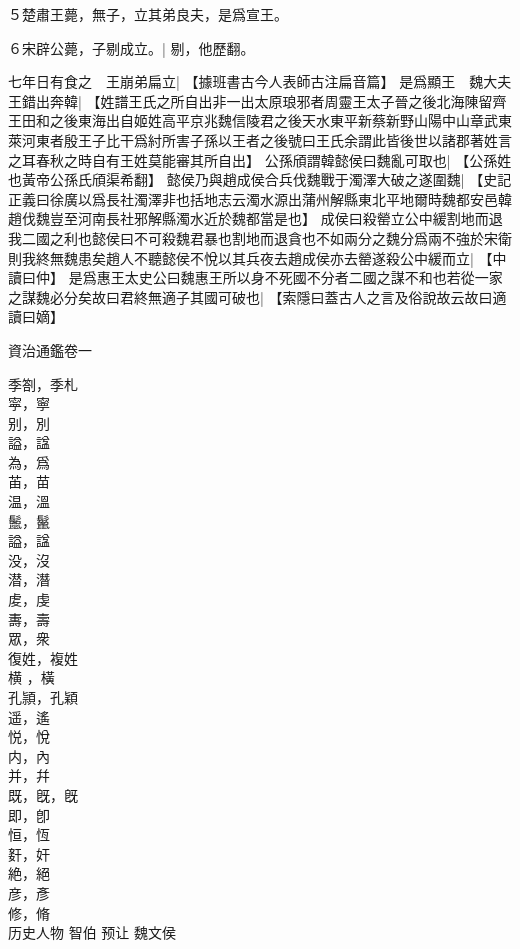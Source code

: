 ５楚肅王薨，無子，立其弟良夫，是爲宣王。

６宋辟公薨，子剔成立。|{
	剔，他歷翻。
	}


七年日有食之　王崩弟扁立|{
	【據班書古今人表師古注扁音篇】}
是爲顯王　魏大夫王錯出奔韓|{
	【姓譜王氏之所自出非一出太原琅邪者周靈王太子晉之後北海陳留齊王田和之後東海出自姬姓高平京兆魏信陵君之後天水東平新蔡新野山陽中山章武東萊河東者殷王子比干爲紂所害子孫以王者之後號曰王氏余謂此皆後世以諸郡著姓言之耳春秋之時自有王姓莫能審其所自出】}
公孫頎謂韓懿侯曰魏亂可取也|{
	【公孫姓也黃帝公孫氏頎渠希翻】}
懿侯乃與趙成侯合兵伐魏戰于濁澤大破之遂圍魏|{
	【史記正義曰徐廣以爲長社濁澤非也括地志云濁水源出蒲州解縣東北平地爾時魏都安邑韓趙伐魏豈至河南長社邪解縣濁水近於魏都當是也】}
成侯曰殺罃立公中緩割地而退我二國之利也懿侯曰不可殺魏君暴也割地而退貪也不如兩分之魏分爲兩不強於宋衛則我終無魏患矣趙人不聽懿侯不悅以其兵夜去趙成侯亦去罃遂殺公中緩而立|{
	【中讀曰仲】}
是爲惠王太史公曰魏惠王所以身不死國不分者二國之謀不和也若從一家之謀魏必分矣故曰君終無適子其國可破也|{
	【索隱曰蓋古人之言及俗說故云故曰適讀曰嫡】}
\par
資治通鑑卷一

季劄，季札\\
寜，寧\\
别，別\\
謚，諡\\
為，爲\\
苖，苗\\
温，溫\\
鬛，鬣\\
謚，諡\\
没，沒\\
潜，潛\\
䖍，虔\\
夀，壽\\
眾，衆\\
復姓，複姓\\
横                                                                                                                                                            ，橫\\
孔頴，孔穎\\
遥，遙\\
悦，悅\\
内，內\\
并，幷\\
既，旣，旣\\
即，卽\\
恒，恆\\
姧，奸\\
絶，絕\\
彦，彥\\
修，脩\\

历史人物
智伯
预让
魏文侯
